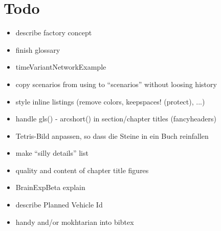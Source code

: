 \section*{Todo}

\begin{itemize}\styleItemize

\item describe factory concept

\item finish glossary

\item timeVariantNetworkExample

\item copy scenarios from using to ``scenarios'' without loosing history

\item style inline listings (remove colors, keepspaces! (protect), ...)

\item handle gls() - arcshort() in section/chapter titles (fancyheaders)

\item Tetris-Bild anpassen, so dass die Steine in ein Buch reinfallen

\item make ``silly details'' list

\item quality and content of chapter title figures

\item BrainExpBeta explain

\item describe Planned Vehicle Id

\item handy and/or mokhtarian into bibtex







\end{itemize}
